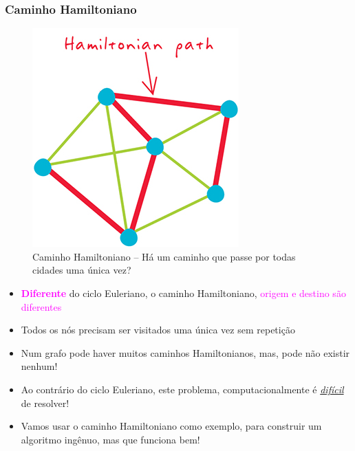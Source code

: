 \begin{frame}[fragile, allowframebreaks=0.9]
 \frametitle{Caminho Hamiltoniano}


\begin{figure}[!htb]
\centering
\includegraphics[width=.6\textwidth, height=0.60\textheight]{figures/hamiltonian_path.jpg}
\caption{Caminho Hamiltoniano -- Há um caminho que passe por todas cidades uma única vez?}
\end{figure}


\framebreak

\begin{itemize}
  \item \textcolor{magenta}{\textbf{Diferente}} do ciclo Euleriano, o caminho Hamiltoniano, \textcolor{magenta}{origem
  e destino são diferentes}
 
\item Todos os nós precisam ser visitados uma única vez sem repetição

\item  Num grafo pode haver muitos caminhos  Hamiltonianos, mas, pode
       não existir nenhum!

\item Ao contrário do ciclo Euleriano, este problema, computacionalmente é \underline{\textit{difícil}} de resolver!

\item Vamos usar o caminho Hamiltoniano como exemplo, para construir um algoritmo  ingênuo, mas que funciona bem!
\end{itemize}

\end{frame}


